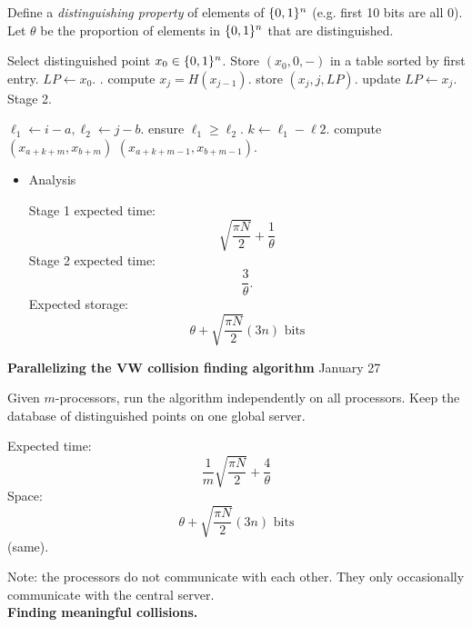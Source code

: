 \documentclass[a4paper,12pt]{article}
\def\LState{\State\unskip\the\therules}%
\begin{document}
Define a {\it distinguishing property} of elements of $\{0,1\}^n$ 
(e.g. first 10 bits are all 0).  Let $\theta$ be the proportion of elements in
$\{0,1\}^n$ that are distinguished.
\begin{algorithmic}

\label{S1} 
	\LState
	Select distinguished point $x_0\in \{0,1\}^n$.
	\LState660
	Store $(x_0,0,-)$ in a table sorted by first entry.
	\LState
	$LP\gets x_0$. .
		\LState compute $x_j = H(x_{j-1})$.
			\LState store $(x_j,j,LP)$.
			\LState update $LP \gets x_j$.
				\LState {\bf goto} {\sc Stage 2}.
			\EndIf
		\EndIf
	\EndFor
\EndProcedure
\end{algorithmic}
\clearpage
\begin{algorithmic}
\label{S2} 
	\LState $\ell_1 \gets i-a, \ell_2 \gets j-b$.
	\LState ensure $\ell_1 \ge \ell_2$.
	\LState $k\gets \ell_1 - \ell 2$.
		\LState compute $(x_{a+k+m},x_{b+m})$
			\LState {\bf return} $(x_{a+k+m-1},x_{b+m-1})$.
		\EndIf
	\EndFor
	
\EndProcedure
\end{algorithmic}
\begin{itemize}
\item
Analysis

Stage 1 expected time:
$$
\sqrt{\frac{\pi N}{2}} + \frac{1}{\theta}
$$
Stage 2 expected time:
$$
\frac{3}{\theta}.
$$
Expected storage:
$$
\theta + \sqrt{\frac{\pi N}{2}} (3n) \text{ bits}
$$
\end{itemize}

\clearpage

{\bf Parallelizing the VW collision finding algorithm} \hfill January 27

Given $m$-processors, run the algorithm independently on all processors.
Keep the database of distinguished points on one global server.

Expected time:
$$
\frac{1}{m} \sqrt{\frac{\pi N}{2}} + \frac{4}{\theta}
$$
Space: 
$$
\theta + \sqrt{\frac{\pi N}{2}} (3n) \text{ bits}
$$
(same).

Note: the processors do not communicate with each other.  They only occasionally communicate with the central server.
\\[2em]
{\bf Finding meaningful collisions.}
\end{document}
